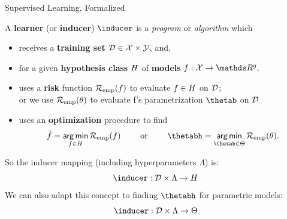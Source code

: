 \documentclass[11pt,compress,t,notes=noshow, xcolor=table]{beamer}
\begin{document}
\begin{vbframe}{Supervised Learning, Formalized}

A \textbf{learner} (or \textbf{inducer}) $\inducer$ is a \emph{program} or 
\emph{algorithm} which

\begin{itemize}

  \item receives a \textbf{training set} $\mathcal{D} \in \mathcal{X} \times \mathcal{Y}$, and,
  
  \item for a given \textbf{hypothesis class} $H$ of \textbf{models} 
  $f:\Xspace \rightarrow \R^g,$ 
  
  \item uses a \textbf{risk} function $\mathcal{R}_{\text{emp}}(f)$ to evaluate $f \in H$ on $\mathcal{D}$;\\ 
  or we use $\mathcal{R}_{\text{emp}}(\theta)$ to evaluate f's parametrization $\thetab$ on $\mathcal{D}$
  
  \item uses an \textbf{optimization} procedure to find
      $$\fh = \argmin_{f \in \Hspace} \riskef \qquad \text{ or } \qquad \thetabh = \argmin_{\thetab \in \Theta} \risket.$$

\end{itemize}
So the inducer mapping (including hyperparameters $\Lambda$) is:
\[\inducer: \D \times \Lambda \rightarrow \Hspace\]
We can also adapt this concept to finding $\thetabh$ for parametric
models:
\[\inducer: \D \times \Lambda \rightarrow \Theta\]






\end{vbframe}



\end{document}
